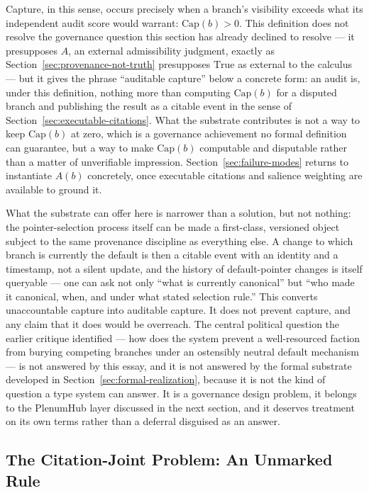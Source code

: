 \documentclass[11pt]{article}
\theoremstyle{definition}
\begin{document}
Capture, in this sense, occurs precisely when a branch's visibility exceeds what its independent audit score would warrant: $\mathrm{Cap}(b) > 0$. This definition does not resolve the governance question this section has already declined to resolve --- it presupposes $A$, an external admissibility judgment, exactly as Section~\ref{sec:provenance-not-truth} presupposes $\mathrm{True}$ as external to the calculus --- but it gives the phrase ``auditable capture'' below a concrete form: an audit is, under this definition, nothing more than computing $\mathrm{Cap}(b)$ for a disputed branch and publishing the result as a citable event in the sense of Section~\ref{sec:executable-citations}. What the substrate contributes is not a way to keep $\mathrm{Cap}(b)$ at zero, which is a governance achievement no formal definition can guarantee, but a way to make $\mathrm{Cap}(b)$ computable and disputable rather than a matter of unverifiable impression. Section~\ref{sec:failure-modes} returns to instantiate $A(b)$ concretely, once executable citations and salience weighting are available to ground it.

What the substrate can offer here is narrower than a solution, but not nothing: the pointer-selection process itself can be made a first-class, versioned object subject to the same provenance discipline as everything else. A change to which branch is currently the default is then a citable event with an identity and a timestamp, not a silent update, and the history of default-pointer changes is itself queryable --- one can ask not only ``what is currently canonical'' but ``who made it canonical, when, and under what stated selection rule.'' This converts unaccountable capture into auditable capture. It does not prevent capture, and any claim that it does would be overreach. The central political question the earlier critique identified --- how does the system prevent a well-resourced faction from burying competing branches under an ostensibly neutral default mechanism --- is not answered by this essay, and it is not answered by the formal substrate developed in Section~\ref{sec:formal-realization}, because it is not the kind of question a type system can answer. It is a governance design problem, it belongs to the PlenumHub layer discussed in the next section, and it deserves treatment on its own terms rather than a deferral disguised as an answer.

\subsection{The Citation-Joint Problem: An Unmarked Rule}
\label{sec:citation-joint}
\end{document}
